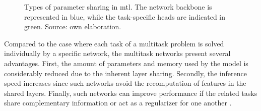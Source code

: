 \begin{figure}[ht]
\centering
{}
\hfill
{}    
\caption{Types of parameter sharing in \acl{mtl}. The network backbone is represented in blue, while the task-specific heads are indicated in green. Source: own elaboration.}
\label{fig:mtl_sharing}
\end{figure}

Compared to the case where each task of a multitask problem is solved individually by a specific network, the multitask networks present several advantages. First, the amount of parameters and memory used by the model is considerably reduced due to the inherent layer sharing. Secondly, the inference speed increases since such networks avoid the recomputation of features in the shared layers. Finally, such networks can improve performance if the related tasks share complementary information or act as a regularizer for one another \citep{vandenhende2021multi}. 



